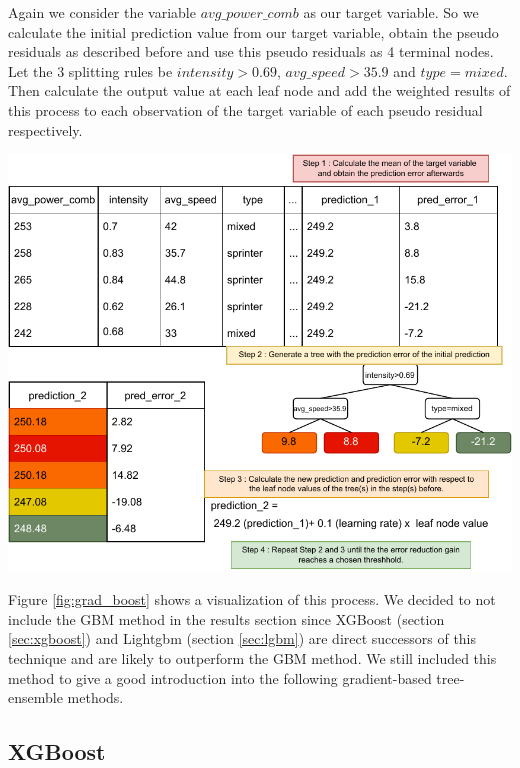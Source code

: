 \documentclass[12pt,a4paper]{article}
\let\origfigure\figure
\let\endorigfigure\endfigure
\renewenvironment{figure}[1][2] {
    \expandafter\origfigure\expandafter[H]
} {
    \endorigfigure
}
\begin{document}
Again we consider the variable \(avg\_power\_comb\) as our target variable. So we calculate the initial prediction value from our target variable, obtain the pseudo residuals as described before and use this pseudo residuals as 4 terminal nodes. Let the 3 splitting rules be \(intensity>0.69\), \(avg\_speed>35.9\) and \(type = mixed\). Then calculate the output value at each leaf node and add the weighted results of this process to each observation of the target variable of each pseudo residual respectively.

\begin{figure}
\centering
\includegraphics{./includes/grad_boost.pdf}
\caption{The diagram shows exemplary how GBM calculates the predictions.}
\label{fig:grad_boost}
\end{figure}

Figure \ref{fig:grad_boost} shows a visualization of this process. We decided to not include the GBM method in the results section since XGBoost (section \ref{sec:xgboost}) and Lightgbm (section \ref{sec:lgbm}) are direct successors of this technique and are likely to outperform the GBM method. We still included this method to give a good introduction into the following gradient-based tree-ensemble methods.

\hypertarget{xgboost}{%
\subsection{\texorpdfstring{XGBoost \label{sec:xgboost}}{XGBoost }}\label{xgboost}}
\end{document}
